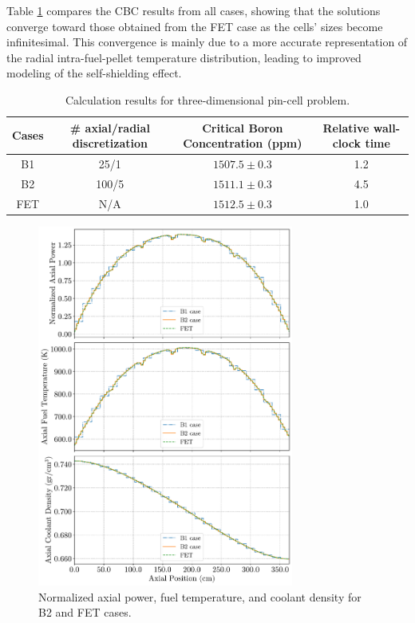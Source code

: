 Table \ref{tab3} compares the CBC results from all cases, showing that the solutions converge toward those obtained from the FET case as the cells' sizes become infinitesimal. This convergence is mainly due to a more accurate representation of the radial intra-fuel-pellet temperature distribution, leading to improved modeling of the self-shielding effect.
\begin{table}
    \centering
    \caption{Calculation results for three-dimensional pin-cell problem.}
    \label{tab3} 
    \begin{tabular}{| c | c | c | c | }
    \hline 
     Cases & \# axial/radial discretization & Critical Boron Concentration (ppm) & Relative wall-clock time \\
     \hline
     B1     & 25/1  & $1507.5\pm0.3$ & 1.2      \\ \hline
     B2     & 100/5 & $1511.1\pm0.3$ & 4.5      \\ \hline
     FET    & N/A   & $1512.5\pm0.3$ & 1.0      \\ \hline
    \end{tabular}
\end{table}

\begin{figure}
    \centering
    \includegraphics[width=0.75\textwidth]{figs/temp_dens.pdf}
    \caption[Normalized axial power, fuel temperature, and coolant density]{Normalized axial power, fuel temperature, and coolant density for B2 and FET cases.}
    \label{fig_44}
\end{figure}

